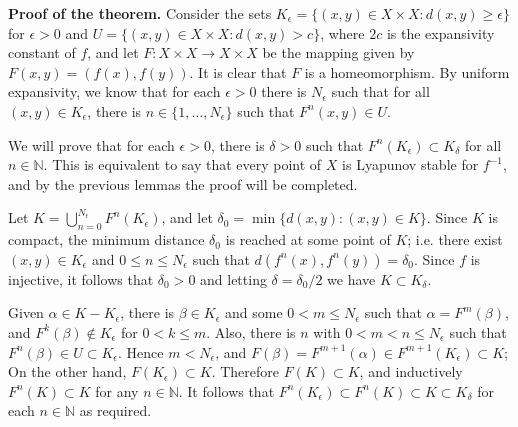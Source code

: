 \documentclass[12pt]{article}
\newcommand{\N}{\mathbb{N}}
\newcommand{\F}{F}
\begin{document}
\textbf{Proof of the theorem.}
 Consider the sets $K_\epsilon = \{(x,y)\in X\times X : d(x,y)\geq \epsilon\}$ for $\epsilon>0$ and $U=\{(x,y)\in X\times X : d(x,y)>c\}$, where $2c$ is the expansivity constant of $f$, and let $\F\colon X\times X\to X\times X$ be the mapping given by $\F(x,y)=(f(x),f(y))$. It is clear that $\F$ is a homeomorphism.
By uniform expansivity, we know that for each $\epsilon>0$ there is $N_\epsilon$ such that for all $(x,y)\in K_\epsilon$, there is $n\in\{1,\dots,N_\epsilon\}$ such that $\F^n(x,y)\in U$.

We will prove that for each $\epsilon>0$, there is $\delta>0$ such that
$F^n(K_\epsilon)\subset K_\delta$ for all $n\in \N$. This is equivalent to say that every point of $X$ is Lyapunov stable for $f^{-1}$, and by the previous lemmas the proof will be completed.

Let $K=\bigcup_{n=0}^{N_\epsilon} \F^n(K_\epsilon)$, and let $\delta_0=\min\{d(x,y): (x,y)\in K\}$.
Since $K$ is compact, the minimum distance $\delta_0$ is reached at some point of $K$; i.e. there exist $(x,y)\in K_\epsilon$ and
$0\leq n\leq N_\epsilon$ such that $d(f^n(x),f^n(y))=\delta_0$.
Since $f$ is injective, it follows that $\delta_0>0$ and letting
$\delta = \delta_0/2$ we have $K\subset K_\delta$.

Given $\alpha\in K-K_\epsilon$, there is $\beta\in K_\epsilon$ and some $0<m\leq N_\epsilon$ such that $\alpha=\F^m(\beta)$, and $\F^k(\beta)\notin K_\epsilon$ for $0<k\leq m$.
Also, there is $n$ with $0<m<n\leq N_\epsilon$ such that $\F^n(\beta)\in U\subset K_\epsilon$. Hence $m<N_\epsilon$,
and $\F(\beta)=\F^{m+1}(\alpha)\in \F^{m+1}(K_\epsilon)\subset K$; On the other hand, $\F(K_\epsilon)\subset K$. Therefore $F(K)\subset K$, and inductively $\F^n(K)\subset K$ for any $n\in \N$. It follows
that $\F^n(K_\epsilon)\subset F^n(K)\subset K \subset K_\delta$ for each $n\in \N$ as required.
\end{document}
